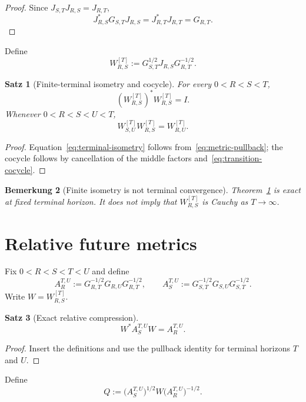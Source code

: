 \documentclass[11pt,a4paper]{amsart}
\newtheorem{theorem}{Satz}[section]
\newtheorem{remark}[theorem]{Bemerkung}
\begin{document}
\begin{proof}
Since $J_{S,T}J_{R,S}=J_{R,T}$,
\[
 J_{R,S}^*G_{S,T}J_{R,S}=J_{R,T}^*J_{R,T}=G_{R,T}.
\]
\end{proof}

Define
\[
 \boxed{
 W_{R,S}^{[T]}
 :=G_{S,T}^{1/2}J_{R,S}G_{R,T}^{-1/2}.
 }
\tag{4.7}\label{eq:terminal-W}
\]

\begin{theorem}[Finite-terminal isometry and cocycle]\label{thm:terminal-isometry}
For every $0<R<S<T$,
\[
 \boxed{(W_{R,S}^{[T]})^*W_{R,S}^{[T]}=I.}
\tag{4.8}\label{eq:terminal-isometry}
\]
Whenever $0<R<S<U<T$,
\[
 \boxed{W_{S,U}^{[T]}W_{R,S}^{[T]}=W_{R,U}^{[T]}.}
\tag{4.9}\label{eq:terminal-cocycle}
\]
\end{theorem}

\begin{proof}
Equation~\eqref{eq:terminal-isometry} follows from~\eqref{eq:metric-pullback}; the cocycle follows by cancellation of
the middle factors and~\eqref{eq:transition-cocycle}.
\end{proof}

\begin{remark}[Finite isometry is not terminal convergence]\label{rem:notlimit}
Theorem~\ref{thm:terminal-isometry} is exact at fixed terminal horizon.  It does not
imply that $W_{R,S}^{[T]}$ is Cauchy as $T\to\infty$.
\end{remark}

\section{Relative future metrics}\label{sec:relative}

Fix $0<R<S<T<U$ and define
\[
 A_R^{T,U}:=G_{R,T}^{-1/2}G_{R,U}G_{R,T}^{-1/2},
\qquad
 A_S^{T,U}:=G_{S,T}^{-1/2}G_{S,U}G_{S,T}^{-1/2}.
\tag{5.1}\label{eq:relative-metrics}
\]
Write $W=W_{R,S}^{[T]}$.

\begin{theorem}[Exact relative compression]\label{thm:relative-compression}
\[
 \boxed{W^*A_S^{T,U}W=A_R^{T,U}.}
\tag{5.2}\label{eq:relative-compression}
\]
\end{theorem}

\begin{proof}
Insert the definitions and use the pullback identity for terminal horizons $T$ and $U$.
\end{proof}

Define
\[
 Q:=\bigl(A_S^{T,U}\bigr)^{1/2}W\bigl(A_R^{T,U}\bigr)^{-1/2}.
\]
\end{document}
